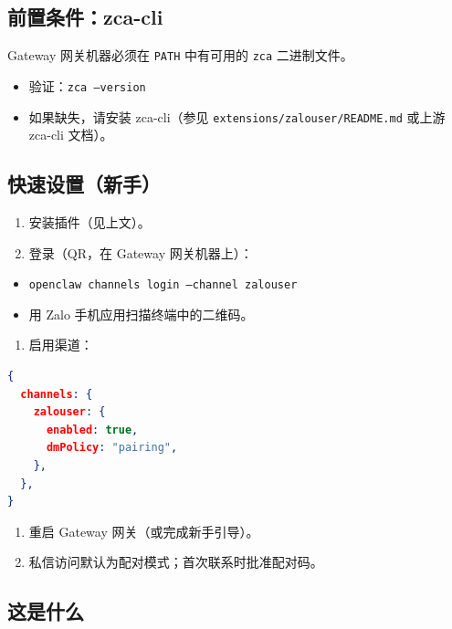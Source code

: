 \subsection{前置条件：zca-cli}


Gateway 网关机器必须在 \texttt{PATH} 中有可用的 \texttt{zca} 二进制文件。

\begin{itemize}
  \item 验证：\texttt{zca --version}
  \item 如果缺失，请安装 zca-cli（参见 \texttt{extensions/zalouser/README.md} 或上游 zca-cli 文档）。
\end{itemize}


\subsection{快速设置（新手）}


\begin{enumerate}
  \item 安装插件（见上文）。
  \item 登录（QR，在 Gateway 网关机器上）：
\end{enumerate}

\begin{itemize}
  \item \texttt{openclaw channels login --channel zalouser}
  \item 用 Zalo 手机应用扫描终端中的二维码。
\end{itemize}

\begin{enumerate}
  \item 启用渠道：
\end{enumerate}


\begin{lstlisting}[language=json]
{
  channels: {
    zalouser: {
      enabled: true,
      dmPolicy: "pairing",
    },
  },
}
\end{lstlisting}


\begin{enumerate}
  \item 重启 Gateway 网关（或完成新手引导）。
  \item 私信访问默认为配对模式；首次联系时批准配对码。
\end{enumerate}


\subsection{这是什么}


